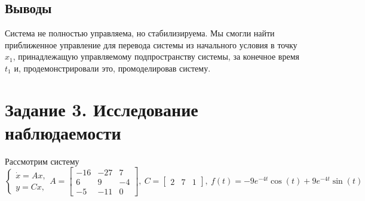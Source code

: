 \documentclass[a4paper, 12pt]{article}
\begin{document}
    \subsection{Выводы}
    Система не полностью управляема, но стабилизируема. Мы смогли найти приближенное управление для перевода системы из начального условия
    в точку $x_1$, принадлежащую управляемому подпространству системы, за конечное время $t_1$ и, продемонстрировали это, промоделировав систему.


    \section{Задание 3. Исследование наблюдаемости}
    Рассмотрим систему
    $$
    \begin{cases}
        \dot{x}=Ax,\\
        y=Cx,
    \end{cases} A=\begin{bmatrix}
        -16 &-27 &7\\
        6 &9 &-4\\
        -5 &-11 &0
    \end{bmatrix},\ C=\begin{bmatrix}
        2 &7 &1
    \end{bmatrix},\ f(t)=-9e^{-4t}\cos{(t)}+9e^{-4t}\sin{(t)}
    $$
\end{document}
